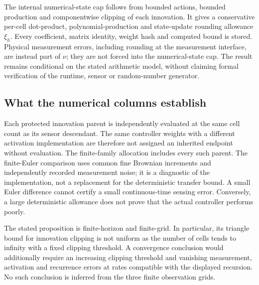 The internal numerical-state cap follows from bounded actions, bounded production and componentwise clipping of each innovation. It gives a conservative per-cell dot-product, polynomial-production and state-update rounding allowance $\xi_h$. Every coefficient, matrix identity, weight hash and computed bound is stored. Physical measurement errors, including rounding at the measurement interface, are instead part of $\nu$; they are not forced into the numerical-state cap. The result remains conditional on the stated arithmetic model, without claiming formal verification of the runtime, sensor or random-number generator.

\subsection{What the numerical columns establish}
Each protected innovation parent is independently evaluated at the same cell count as its sensor descendant. The same controller weights with a different activation implementation are therefore not assigned an inherited endpoint without evaluation. The finite-family allocation includes every such parent. The finite-Euler comparison uses common fine Brownian increments and independently recorded measurement noise; it is a diagnostic of the implementation, not a replacement for the deterministic transfer bound. A small Euler difference cannot certify a small continuous-time sensing error. Conversely, a large deterministic allowance does not prove that the actual controller performs poorly.

The stated proposition is finite-horizon and finite-grid. In particular, its triangle bound for innovation clipping is not uniform as the number of cells tends to infinity with a fixed clipping threshold. A convergence conclusion would additionally require an increasing clipping threshold and vanishing measurement, activation and recurrence errors at rates compatible with the displayed recursion. No such conclusion is inferred from the three finite observation grids.
